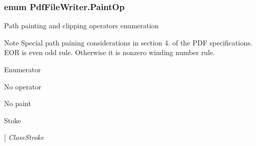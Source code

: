 \subsubsection[{\texorpdfstring{Paint\+Op}{PaintOp}}]{\setlength{\rightskip}{0pt plus 5cm}enum {\bf Pdf\+File\+Writer.\+Paint\+Op}\hspace{0.3cm}{\ttfamily [strong]}}\hypertarget{namespace_pdf_file_writer_a1bd0bc3fdabed20e2459496f1bbe2101}{}\label{namespace_pdf_file_writer_a1bd0bc3fdabed20e2459496f1bbe2101}


Path painting and clipping operators enumeration 

Note Special path paining considerations in section 4. of the P\+DF specifications. E\+OR is even odd rule. Otherwise it is nonzero winding number rule. \begin{Desc}
\item[Enumerator]\par
\begin{description}
\item[{\em 
No\+Operator\hypertarget{namespace_pdf_file_writer_a1bd0bc3fdabed20e2459496f1bbe2101a940602ed2639e31c1c24389512f17793}{}\label{namespace_pdf_file_writer_a1bd0bc3fdabed20e2459496f1bbe2101a940602ed2639e31c1c24389512f17793}
}]No operator \item[{\em 
No\+Paint\hypertarget{namespace_pdf_file_writer_a1bd0bc3fdabed20e2459496f1bbe2101a57528f8b874a3408cbec9c2f2de78c53}{}\label{namespace_pdf_file_writer_a1bd0bc3fdabed20e2459496f1bbe2101a57528f8b874a3408cbec9c2f2de78c53}
}]No paint \item[{\em 
Stroke\hypertarget{namespace_pdf_file_writer_a1bd0bc3fdabed20e2459496f1bbe2101a8e763d9065582268c9ffa345a3f81f5f}{}\label{namespace_pdf_file_writer_a1bd0bc3fdabed20e2459496f1bbe2101a8e763d9065582268c9ffa345a3f81f5f}
}]Stoke \item[{\em 
Close\+Stroke\hypertarget{namespace_pdf_file_writer_a1bd0bc3fdabed20e2459496f1bbe2101a9bc5d7ce06deda616d1e8f19f8d82b23}{}\label{namespace_pdf_file_writer_a1bd0bc3fdabed20e2459496f1bbe2101a9bc5d7ce06deda616d1e8f19f8d82b23}
}
\end{description}
\end{Desc}
